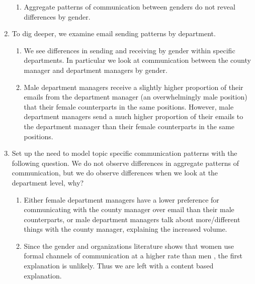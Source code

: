 \documentclass[fleqn]{MJDArticle}
\begin{document}
\begin{enumerate}
	\begin{enumerate}
		\item Aggregate patterns of communication between genders do not reveal differences by gender. 
	\end{enumerate}
	\item To dig deeper, we examine email sending patterns by department.
	\begin{enumerate}
		\item We see differences in sending and receiving by gender within specific departments. In particular we look at communication between the county manager and department managers by gender.
		\item Male department managers receive a slightly higher proportion  of their emails from the department manager (an overwhelmingly male position) that their female counterparts in the same positions. However, male department managers send a much higher proportion of their emails to the department manager than their female counterparts in the same positions. 
	\end{enumerate}
	\item Set up the need to model topic specific communication patterns with the following question. We do not observe differences in aggregate patterns of communication, but we do observe differences when we look at the department level, why?
	\begin{enumerate}
		\item Either female department managers have a lower preference for communicating with the county manager over email than their male counterparts, or male department managers talk about more/different things with the county manager, explaining the increased volume. 
		\item Since the gender and organizations literature shows that women use formal channels of communication at a higher rate than men \citep{Ragins1989}, the first explanation is unlikely. Thus we are left with a content based explanation.
	\end{enumerate}
\end{enumerate}
\end{document}
